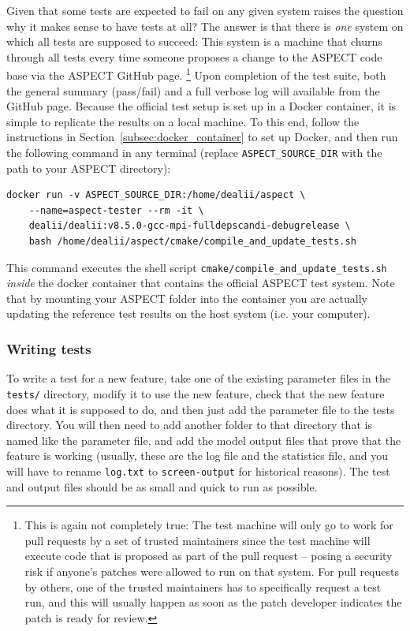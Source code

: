 \documentclass{article}
\newcommand{\aspect}{\textsc{ASPECT}}
\begin{document}
Given that some tests are expected to fail on any given system raises the
question why it makes sense to have tests at all? The answer is that there is
\textit{one} system on which all tests are supposed to succeed: This system is a
machine that churns through all tests every time someone proposes a change to
the \aspect{} code base via the \aspect{} GitHub page.%
\footnote{This is again not completely true: The test machine will only go to
work for pull requests by a set of trusted maintainers since the test machine
will execute code that is proposed as part of the pull request -- posing a
security risk if anyone's patches were allowed to run on that system. For pull
requests by others, one of the trusted maintainers has to specifically request a
test run, and this will usually happen
as soon as the patch developer indicates the patch is ready for review.}
Upon completion of the test suite, both the general summary (pass/fail) and a
full verbose log will available from the GitHub page. Because the official test
setup is set up in a Docker container, it is simple to replicate the results on
a local machine. To this end, follow the instructions in
Section~\ref{subsec:docker_container} to set up Docker, and then run the
following command in any terminal (replace \texttt{ASPECT\_SOURCE\_DIR} with
the path to your \aspect{} directory):
\begin{lstlisting}[frame=single,language=ksh] 
    docker run -v ASPECT_SOURCE_DIR:/home/dealii/aspect \
    --name=aspect-tester --rm -it \
    dealii/dealii:v8.5.0-gcc-mpi-fulldepscandi-debugrelease \
    bash /home/dealii/aspect/cmake/compile_and_update_tests.sh
\end{lstlisting}

This command executes the shell script 
\texttt{cmake/compile\_and\_update\_tests.sh} \textit{inside} the docker
container that contains the official \aspect{} test system. Note that by
mounting your \aspect{} folder into the container you are actually updating the
reference test results on the host system (i.e. your computer).


\subsubsection{Writing tests}
\label{sec:writing_tests}

To write a test for a new feature, take one of the existing parameter files in
the \texttt{tests/} directory, modify it to use the new feature, check that the
new feature does what it is supposed to do, and then just add the parameter file to
the tests directory. You will then need to add another folder to that directory
that is named like the parameter file, and add the model output files that
prove that the feature is working (usually, these are the log file and the statistics 
file, and you will have to rename \texttt{log.txt} to
\texttt{screen-output} for historical reasons). The test and output files should
be as small and quick to run as possible.
\end{document}
